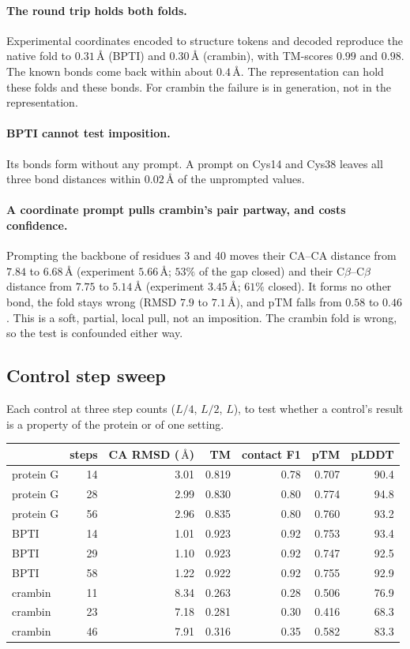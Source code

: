 \documentclass[11pt,a4paper]{article}
\newcommand{\ang}{\,\mbox{\AA}}
\begin{document}
\paragraph{The round trip holds both folds.} Experimental coordinates encoded to
structure tokens and decoded reproduce the native fold to $0.31\ang$ (BPTI) and
$0.30\ang$ (crambin), with TM-scores $0.99$ and $0.98$. The known bonds come back
within about $0.4\ang$. The representation can hold these folds and these bonds.
For crambin the failure is in generation, not in the representation.

\paragraph{BPTI cannot test imposition.} Its bonds form without any prompt. A
prompt on Cys14 and Cys38 leaves all three bond distances within $0.02\ang$ of
the unprompted values.

\paragraph{A coordinate prompt pulls crambin's pair partway, and costs confidence.}
Prompting the backbone of residues 3 and 40 moves their CA--CA distance from
$7.84$ to $6.68\ang$ (experiment $5.66\ang$; $53\%$ of the gap closed) and their
C$\beta$--C$\beta$ distance from $7.75$ to $5.14\ang$ (experiment $3.45\ang$;
$61\%$ closed). It forms no other bond, the fold stays wrong (RMSD $7.9$ to
$7.1\ang$), and pTM falls from $0.58$ to $0.46$. This is a soft, partial, local
pull, not an imposition. The crambin fold is wrong, so the test is confounded
either way.
\subsection{Control step sweep}

Each control at three step counts ($L/4$, $L/2$, $L$), to test whether a
control's result is a property of the protein or of one setting.

\begin{center}
\small
\begin{tabular}{@{}lrrrrrr@{}}
\toprule
 & steps & CA RMSD ($\ang$) & TM & contact F1 & pTM & pLDDT \\
\midrule
protein G & 14 & 3.01 & 0.819 & 0.78 & 0.707 & 90.4 \\
protein G & 28 & 2.99 & 0.830 & 0.80 & 0.774 & 94.8 \\
protein G & 56 & 2.96 & 0.835 & 0.80 & 0.760 & 93.2 \\
BPTI & 14 & 1.01 & 0.923 & 0.92 & 0.753 & 93.4 \\
BPTI & 29 & 1.10 & 0.923 & 0.92 & 0.747 & 92.5 \\
BPTI & 58 & 1.22 & 0.922 & 0.92 & 0.755 & 92.9 \\
crambin & 11 & 8.34 & 0.263 & 0.28 & 0.506 & 76.9 \\
crambin & 23 & 7.18 & 0.281 & 0.30 & 0.416 & 68.3 \\
crambin & 46 & 7.91 & 0.316 & 0.35 & 0.582 & 83.3 \\
\bottomrule
\end{tabular}
\end{center}
\end{document}
